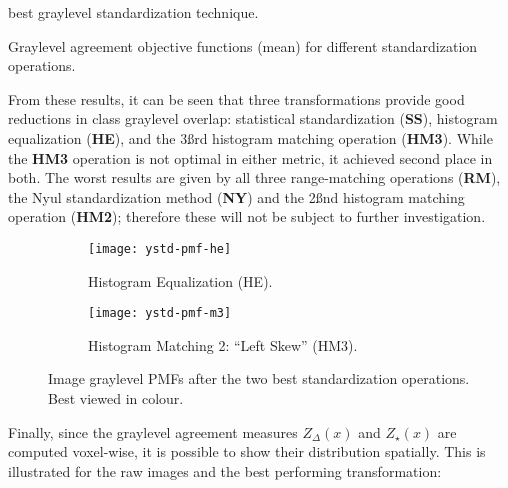 best graylevel standardization technique.
\par
\begin{table}
  \centering
  \caption{Graylevel agreement objective functions (mean) for different standardization operations.}%
  \label{tab:ystd-exp}
  
\end{table}
From these results, it can be seen that three transformations provide
good reductions in class graylevel overlap:
statistical standardization (\textbf{SS}),
histogram equalization (\textbf{HE}),
and the 3\ss{rd} histogram matching operation (\textbf{HM3}).
While the \textbf{HM3} operation is not optimal in either metric,
it achieved second place in both.
The worst results are given by
all three range-matching operations (\textbf{RM}),
the Nyul standardization method (\textbf{NY})
and the 2\ss{nd} histogram matching operation (\textbf{HM2});
therefore these will not be subject to further investigation.
\begin{figure}
  \centering
  \begin{subfigure}{\plotwidth}
    \texttt{[image: ystd-pmf-he]}
    \caption{Histogram Equalization (HE).}%
    \label{fig:ystd-pmf-he}
  \end{subfigure}
  \begin{subfigure}{\plotwidth}
    \texttt{[image: ystd-pmf-m3]}
    \caption{Histogram Matching 2: ``Left Skew'' (HM3).}%
    \label{fig:ystd-pmf-hm2}
  \end{subfigure}
  \caption{Image graylevel PMFs after the two best standardization operations.
    Best viewed in colour.}%
  \label{fig:ystd-pmf-best}
\end{figure}
Finally, since the graylevel agreement measures $Z_{\Delta}(x)$ and $Z_{\star}(x)$
are computed voxel-wise, it is possible to show their distribution spatially.
This is illustrated for the raw images and the best performing transformation:
